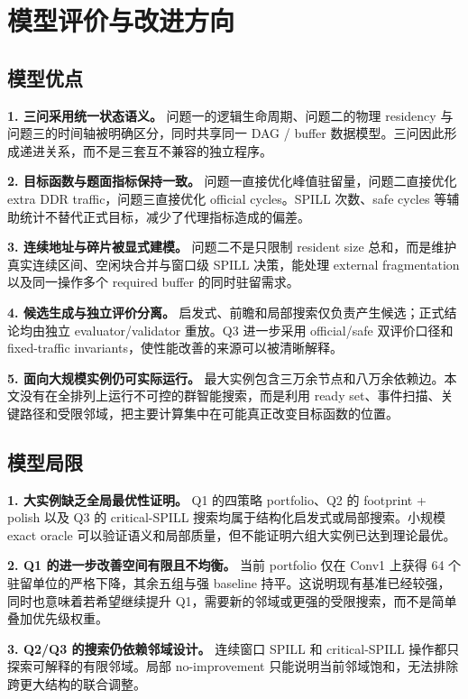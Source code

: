 \section{模型评价与改进方向}

\subsection{模型优点}

\textbf{1. 三问采用统一状态语义。}
问题一的逻辑生命周期、问题二的物理 residency 与问题三的时间轴被明确区分，同时共享同一 DAG / buffer 数据模型。三问因此形成递进关系，而不是三套互不兼容的独立程序。

\textbf{2. 目标函数与题面指标保持一致。}
问题一直接优化峰值驻留量，问题二直接优化 extra DDR traffic，问题三直接优化 official cycles。SPILL 次数、safe cycles 等辅助统计不替代正式目标，减少了代理指标造成的偏差。

\textbf{3. 连续地址与碎片被显式建模。}
问题二不是只限制 resident size 总和，而是维护真实连续区间、空闲块合并与窗口级 SPILL 决策，能处理 external fragmentation 以及同一操作多个 required buffer 的同时驻留需求。

\textbf{4. 候选生成与独立评价分离。}
启发式、前瞻和局部搜索仅负责产生候选；正式结论均由独立 evaluator/validator 重放。Q3 进一步采用 official/safe 双评价口径和 fixed-traffic invariants，使性能改善的来源可以被清晰解释。

\textbf{5. 面向大规模实例仍可实际运行。}
最大实例包含三万余节点和八万余依赖边。本文没有在全排列上运行不可控的群智能搜索，而是利用 ready set、事件扫描、关键路径和受限邻域，把主要计算集中在可能真正改变目标函数的位置。

\subsection{模型局限}

\textbf{1. 大实例缺乏全局最优性证明。}
Q1 的四策略 portfolio、Q2 的 footprint + polish 以及 Q3 的 critical-SPILL 搜索均属于结构化启发式或局部搜索。小规模 exact oracle 可以验证语义和局部质量，但不能证明六组大实例已达到理论最优。

\textbf{2. Q1 的进一步改善空间有限且不均衡。}
当前 portfolio 仅在 Conv1 上获得 64 个驻留单位的严格下降，其余五组与强 baseline 持平。这说明现有基准已经较强，同时也意味着若希望继续提升 Q1，需要新的邻域或更强的受限搜索，而不是简单叠加优先级权重。

\textbf{3. Q2/Q3 的搜索仍依赖邻域设计。}
连续窗口 SPILL 和 critical-SPILL 操作都只探索可解释的有限邻域。局部 no-improvement 只能说明当前邻域饱和，无法排除跨更大结构的联合调整。

